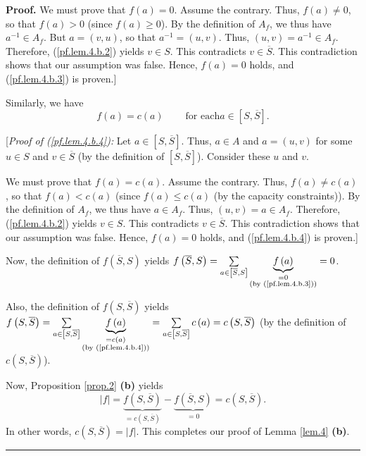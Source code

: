 \documentclass[numbers=enddot,12pt,final,onecolumn,notitlepage]{scrartcl}%
\theoremstyle{definition}
\newenvironment{proof}[1][Proof]{\noindent\textbf{#1.} }{\ \rule{0.5em}{0.5em}}
\let\sumnonlimits\sum
\renewcommand{\sum}{\sumnonlimits\limits}
\begin{document}
\begin{proof}
We must prove that $f\left(  a\right)  =0$. Assume the contrary. Thus,
$f\left(  a\right)  \neq0$, so that $f\left(  a\right)  >0$ (since $f\left(
a\right)  \geq0$). By the definition of $A_{f}$, we thus have $a^{-1}\in
A_{f}$. But $a=\left(  v,u\right)  $, so that $a^{-1}=\left(  u,v\right)  $.
Thus, $\left(  u,v\right)  =a^{-1}\in A_{f}$. Therefore, (\ref{pf.lem.4.b.2})
yields $v\in S$. This contradicts $v\in\overline{S}$. This contradiction shows
that our assumption was false. Hence, $f\left(  a\right)  =0$ holds, and
(\ref{pf.lem.4.b.3}) is proven.]

Similarly, we have%
\begin{equation}
f\left(  a\right)  =c\left(  a\right)  \ \ \ \ \ \ \ \ \ \ \text{for each
}a\in\left[  S,\overline{S}\right]  . \label{pf.lem.4.b.4}%
\end{equation}


[\textit{Proof of (\ref{pf.lem.4.b.4}):} Let $a\in\left[  S,\overline
{S}\right]  $. Thus, $a\in A$ and $a=\left(  u,v\right)  $ for some $u\in S$
and $v\in\overline{S}$ (by the definition of $\left[  S,\overline{S}\right]
$). Consider these $u$ and $v$.

We must prove that $f\left(  a\right)  =c\left(  a\right)  $. Assume the
contrary. Thus, $f\left(  a\right)  \neq c\left(  a\right)  $, so that
$f\left(  a\right)  <c\left(  a\right)  $ (since $f\left(  a\right)  \leq
c\left(  a\right)  $ (by the capacity constraints)). By the definition of
$A_{f}$, we thus have $a\in A_{f}$. Thus, $\left(  u,v\right)  =a\in A_{f}$.
Therefore, (\ref{pf.lem.4.b.2}) yields $v\in S$. This contradicts
$v\in\overline{S}$. This contradiction shows that our assumption was false.
Hence, $f\left(  a\right)  =0$ holds, and (\ref{pf.lem.4.b.4}) is proven.]

Now, the definition of $f\left(  \overline{S},S\right)  $ yields $f\left(
\overline{S},S\right)  =\sum_{a\in\left[  \overline{S},S\right]
}\underbrace{f\left(  a\right)  }_{\substack{=0\\\text{(by (\ref{pf.lem.4.b.3}%
))}}}=0$.

Also, the definition of $f\left(  S,\overline{S}\right)  $ yields $f\left(
S,\overline{S}\right)  =\sum_{a\in\left[  S,\overline{S}\right]
}\underbrace{f\left(  a\right)  }_{\substack{=c\left(  a\right)  \\\text{(by
(\ref{pf.lem.4.b.4}))}}}=\sum_{a\in\left[  S,\overline{S}\right]  }c\left(
a\right)  =c\left(  S,\overline{S}\right)  $ (by the definition of $c\left(
S,\overline{S}\right)  $).

Now, Proposition \ref{prop.2} \textbf{(b)} yields%
\[
\left\vert f\right\vert =\underbrace{f\left(  S,\overline{S}\right)
}_{=c\left(  S,\overline{S}\right)  }-\underbrace{f\left(  \overline
{S},S\right)  }_{=0}=c\left(  S,\overline{S}\right)  .
\]
In other words, $c\left(  S,\overline{S}\right)  =\left\vert f\right\vert $.
This completes our proof of Lemma \ref{lem.4} \textbf{(b)}.
\end{proof}
\end{document}
